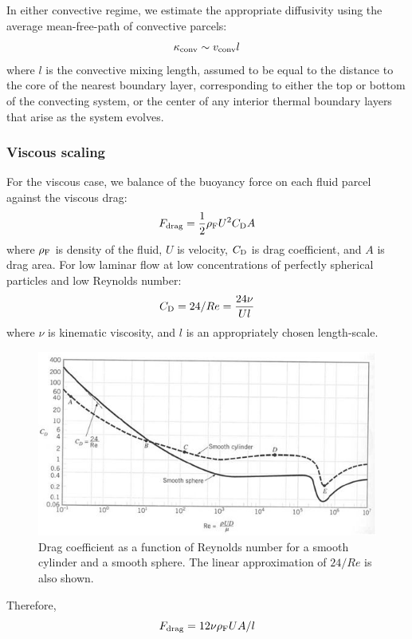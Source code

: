 In either convective regime, we estimate the appropriate diffusivity using the average mean-free-path of convective parcels:
\begin{equation}
\kappa_{\rm conv} \sim v_{\rm conv} l
\end{equation}
where $l$ is the convective mixing length, assumed to be equal to the distance to the core of the nearest boundary layer, corresponding to either the top or bottom of the convecting system, or the center of any interior thermal boundary layers that arise as the system evolves.

\subsubsection{Viscous scaling}
For the viscous case, we balance of the buoyancy force on each fluid parcel against the viscous drag:
\begin{equation}
F_{\rm drag} = \frac{1}{2} \rho_{\rm F} U^2 C_{\rm D} A
\end{equation}
where $\rho_{\rm F}$ is density of the fluid, $U$ is velocity, $C_{\rm D}$ is drag coefficient, and $A$ is drag area.
For low laminar flow at low concentrations of perfectly spherical particles and low Reynolds number:
\begin{equation}
C_{\rm D} = 24 / Re = \frac{24 \nu}{U l}
\end{equation}
where $\nu$ is kinematic viscosity, and $l$ is an appropriately chosen length-scale.
\begin{figure}[!bthp]
\centering
\includegraphics[width=1.0\textwidth]{figs/Shape_CoefficientC.jpg}
\caption{Drag coefficient as a function of Reynolds number for a smooth cylinder and a smooth sphere.  The linear approximation of $24/Re$ is also shown.}
\end{figure}
Therefore,
\begin{equation}
F_{\rm drag} = 12 \nu \rho_{\rm F} U A / l
\end{equation}
